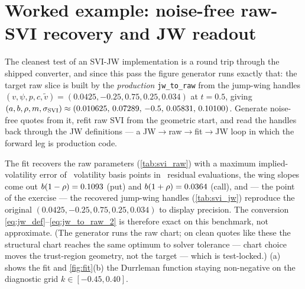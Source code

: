 \documentclass[11pt]{article}
\begin{document}
\section{Worked example: noise-free raw-SVI recovery and JW readout}
\label{sec:example}

The cleanest test of an SVI-JW implementation is a round trip through the
shipped converter, and since this pass the figure generator runs exactly that:
the target raw slice is built by the \emph{production} \texttt{jw\_to\_raw}
from the jump-wing handles
$(v,\psi,p,c,\widetilde v)=(0.0425,-0.25,0.75,0.25,0.034)$ at $t=0.5$, giving
$(a,b,\rho,m,\sigma_{\mathrm{SVI}})\approx(0.010625,\,0.07289,\,-0.5,\,0.05831,\,0.10100)$.
Generate noise-free quotes from it, refit raw SVI from the geometric start,
and read the handles back through the JW definitions --- a
JW$\to$raw$\to$fit$\to$JW loop in which the forward leg is production code.

The fit recovers the raw parameters (\cref{tab:svi_raw}) with a maximum
implied-volatility error of \svimaxerr\ volatility basis points in \svinfev\
residual evaluations, the wing slopes come out $b(1-\rho)=0.1093$ (put) and
$b(1+\rho)=0.0364$ (call), and --- the point of the exercise --- the recovered
jump-wing handles (\cref{tab:svi_jw}) reproduce the original
$(0.0425,-0.25,0.75,0.25,0.034)$ to display precision. The conversion
\eqref{eq:jw_def}--\eqref{eq:jw_to_raw_2} is therefore exact on this
benchmark, not approximate. (The generator runs the raw chart; on clean
quotes like these the structural chart reaches the same optimum to solver
tolerance --- chart choice moves the trust-region geometry, not the target
--- which is test-locked.) \Cref{fig:fit}(a) shows the fit and
\cref{fig:fit}(b) the Durrleman function staying non-negative on the
diagnostic grid $k\in[-0.45,0.40]$.

\begin{table}[H]
\centering
\begin{minipage}{0.46\textwidth}\centering
\caption{Recovered raw SVI.}\label{tab:svi_raw}
\svirawtable
\end{minipage}\hfill
\begin{minipage}{0.46\textwidth}\centering
\caption{Recovered SVI-JW handles.}\label{tab:svi_jw}
\svijwtable
\end{minipage}
\end{table}
\end{document}
